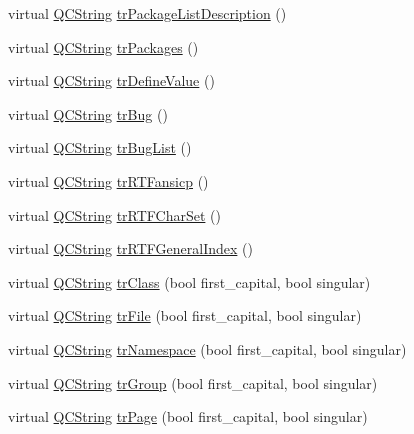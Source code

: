 \begin{DoxyCompactItemize}
virtual \hyperlink{class_q_c_string}{Q\-C\-String} \hyperlink{class_translator_ukrainian_aafd776ddbb24f5b3cf7c2f39c80f8652}{tr\-Package\-List\-Description} ()
\item 
virtual \hyperlink{class_q_c_string}{Q\-C\-String} \hyperlink{class_translator_ukrainian_a5b648094fc927e3078e9af28c26f8bba}{tr\-Packages} ()
\item 
virtual \hyperlink{class_q_c_string}{Q\-C\-String} \hyperlink{class_translator_ukrainian_ae6be6e403011f5b069dde07447839f9e}{tr\-Define\-Value} ()
\item 
virtual \hyperlink{class_q_c_string}{Q\-C\-String} \hyperlink{class_translator_ukrainian_abfa1d6c97f4c2967ebbd515db5590ec6}{tr\-Bug} ()
\item 
virtual \hyperlink{class_q_c_string}{Q\-C\-String} \hyperlink{class_translator_ukrainian_a6922767c9b6ff214503967c6f8b66468}{tr\-Bug\-List} ()
\item 
virtual \hyperlink{class_q_c_string}{Q\-C\-String} \hyperlink{class_translator_ukrainian_ac711f1a109c3c8131bf02a9ff6f48e36}{tr\-R\-T\-Fansicp} ()
\item 
virtual \hyperlink{class_q_c_string}{Q\-C\-String} \hyperlink{class_translator_ukrainian_af3bba50fd4e382b113171e132e88719b}{tr\-R\-T\-F\-Char\-Set} ()
\item 
virtual \hyperlink{class_q_c_string}{Q\-C\-String} \hyperlink{class_translator_ukrainian_a6a04ffa0f1114981e258cf0a94478c98}{tr\-R\-T\-F\-General\-Index} ()
\item 
virtual \hyperlink{class_q_c_string}{Q\-C\-String} \hyperlink{class_translator_ukrainian_a2b5bc0be4e846d4ee6e3430ddeb3cf53}{tr\-Class} (bool first\-\_\-capital, bool singular)
\item 
virtual \hyperlink{class_q_c_string}{Q\-C\-String} \hyperlink{class_translator_ukrainian_abb09819793310c18e4b39a4691b8e681}{tr\-File} (bool first\-\_\-capital, bool singular)
\item 
virtual \hyperlink{class_q_c_string}{Q\-C\-String} \hyperlink{class_translator_ukrainian_a5e5011ab1245fd64707347dae129c574}{tr\-Namespace} (bool first\-\_\-capital, bool singular)
\item 
virtual \hyperlink{class_q_c_string}{Q\-C\-String} \hyperlink{class_translator_ukrainian_a2825eb7956ddf759028c8957352e627d}{tr\-Group} (bool first\-\_\-capital, bool singular)
\item 
virtual \hyperlink{class_q_c_string}{Q\-C\-String} \hyperlink{class_translator_ukrainian_a719e433b483932299fd17e751decdfb2}{tr\-Page} (bool first\-\_\-capital, bool singular)

\end{DoxyCompactItemize}
